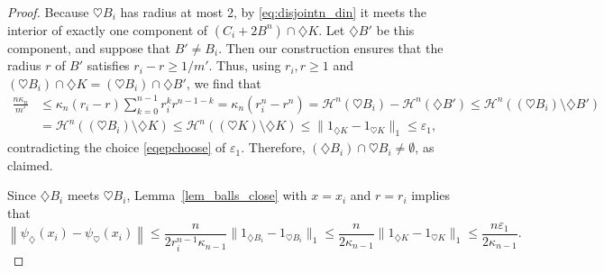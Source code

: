 \documentclass[12pt,reqno]{amsart}
\newcommand{\ee}{\varepsilon}
\newcommand{\cH}{{\mathcal H}}
\newcommand{\di}{\diamondsuit}
\numberwithin{equation}{section}
\begin{document}
\begin{proof}
Because $\heartsuit B_i$ has radius at most 2, by \eqref{eq:disjointn_din} it meets the interior of exactly one component of $(C_i+2B^n)\cap \di K$.  Let $\di B'$ be this component, and suppose that $B'\neq B_i$. Then our construction ensures that the radius $r$ of $B'$ satisfies $r_i-r\ge 1/m'$.  Thus, using $r_i,r\ge 1$ and $(\heartsuit B_i)\cap \di K=(\heartsuit B_i)\cap \di B'$, we find that
\begin{align*}
\frac{n\kappa_n}{m'}&\le  \kappa_n(r_i-r)\sum_{k=0}^{n-1}r_i^kr^{n-1-k}= \kappa_n(r_i^n-r^n)
=\cH^n(\heartsuit B_i)-\cH^n(\di B')
\le \cH^n\left( (\heartsuit B_i)\setminus\di B'\right)\nonumber\\
& = \cH^n((\heartsuit B_i)\setminus \di K)\le \cH^n\left( (\heartsuit K)\setminus\di K\right)\le \|1_{\di K}-1_{\heartsuit K}\|_1\le \ee_1,
\end{align*}
contradicting the choice \eqref{eqepchoose} of $\ee_1$. Therefore, $(\di B_i)\cap \heartsuit B_i\neq\emptyset$, as claimed.

Since $\di B_i$ meets $\heartsuit B_i$, Lemma~\ref{lem_balls_close} with $x=x_i$ and $r=r_i$ implies that
\begin{equation}\label{first_fixed_pointn}
\left\|\psi_{\di}(x_i)-\psi_{\heartsuit}(x_i)\right\|
\le \frac{n}{2r_i^{n-1}\kappa_{n-1}}\|1_{\di B_i}-1_{\heartsuit B_i}\|_1
\le\frac{n}{2\kappa_{n-1}} \|1_{\di K}-1_{\heartsuit K}\|_1\le \frac{n\ee_1}{2\kappa_{n-1}}.
\end{equation}


\end{proof}
\end{document}
